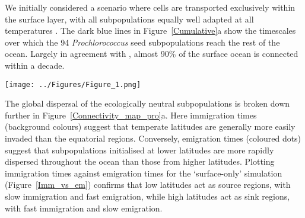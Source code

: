 \documentclass[12pt]{article}
\begin{document}
We initially considered a scenario where cells are transported exclusively within the surface layer, with all subpopulations equally well adapted at all temperatures \citep[i.e. ecologically neutral;][]{Hubbell:2001}. The dark blue lines in Figure~\ref{Cumulative}a show the timescales over which the 94 \textit{Prochlorococcus} seed subpopulations reach the rest of the ocean. Largely in agreement with \citet{Jonsson:2016}, almost 90\% of the surface ocean is connected within a decade. %

\begin{figure*}[htp!]
    \centering
        \texttt{[image: ../Figures/Figure\_1.png]}
\caption{Fraction of connections between the 94 seed locations and the rest of the ocean through time. Solid lines show the results of simulations with time-invariant temperatures and carrying capacities. Dashed lines show the results of simulations with seasonally varying temperature and carrying capacity.}
\label{Cumulative}
\end{figure*}

The global dispersal of the ecologically neutral subpopulations is broken down further in Figure~\ref{Connectivity_map_pro}a. Here immigration times (background colours) suggest that temperate latitudes are generally more easily invaded than the equatorial regions. Conversely, emigration times (coloured dots) suggest that subpopulations initialised at lower latitudes are more rapidly dispersed throughout the ocean than those from higher latitudes. Plotting immigration times against emigration times for the `surface-only' simulation (Figure~\ref{Imm_vs_em}) confirms that low latitudes act as source regions, with slow immigration and fast emigration, while high latitudes act as sink regions, with fast immigration and slow emigration.
\end{document}
